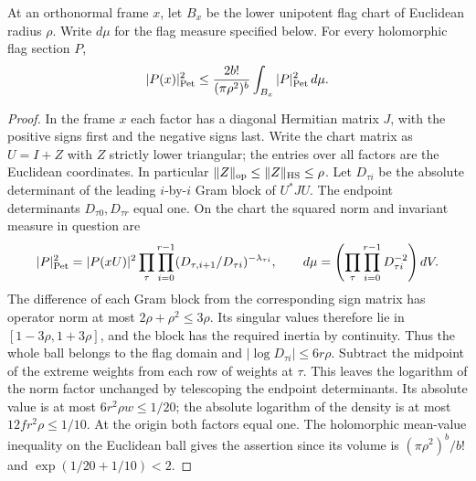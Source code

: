\begin{lemma}\label{bergvol:local}
At an orthonormal frame \(x\), let \(B_x\) be the lower unipotent
flag chart of Euclidean radius \(\rho\). Write \(d\mu\) for the flag
measure specified below. For every holomorphic flag section \(P\),
\[
        |P(x)|_{\rm Pet}^2\le
        \frac{2b!}{(\pi\rho^2)^b}\int_{B_x}|P|_{\rm Pet}^2\,d\mu .
\]
\end{lemma}
\begin{proof}
In the frame \(x\) each factor has a diagonal Hermitian matrix
\(J\), with the positive signs first and the negative signs last.
Write the chart matrix as \(U=I+Z\) with \(Z\) strictly lower
triangular; the entries over all factors are the Euclidean coordinates.
In particular \(\|Z\|_{\rm op}\le\|Z\|_{\rm HS}\le\rho\).
Let \(D_{\tau i}\) be the absolute determinant of the leading
\(i\)-by-\(i\) Gram block of \(U^*JU\). The endpoint determinants
\(D_{\tau0},D_{\tau r}\) equal one. On the chart the squared norm
and invariant measure in question are
\[
 |P|_{\rm Pet}^2=|P(xU)|^2
 \prod_{\tau}\prod_{i=0}^{r-1} (D_{\tau,i+1}/D_{\tau i})^{-\lambda_{\tau i}},
 \qquad
 d\mu=\left(\prod_{\tau}\prod_{i=0}^{r-1}D_{\tau i}^{-2}\right)dV .
\]
The difference of each Gram block from the corresponding sign matrix
has operator norm at most \(2\rho+\rho^2\le3\rho\). Its singular
values therefore lie in \([1-3\rho,1+3\rho]\), and the block has
the required inertia by continuity. Thus the whole ball belongs to
the flag domain and \(|\log D_{\tau i}|\le6r\rho\).
Subtract the midpoint of the extreme weights from each row of
weights at \(\tau\). This leaves the logarithm of the norm factor
unchanged by telescoping the endpoint determinants. Its absolute value
is at most \(6r^2\rho w\le1/20\); the absolute logarithm of the
density is at most \(12fr^2\rho\le1/10\). At the origin both
factors equal one. The holomorphic mean-value inequality on the
Euclidean ball gives the assertion since its volume is
\((\pi\rho^2)^b/b!\) and \(\exp(1/20+1/10)<2\).
\end{proof}

